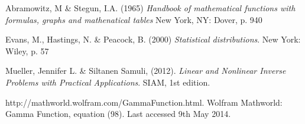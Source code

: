\documentclass[12pt,a4]{article}
\begin{document}
\begin{thebibliography}{9}

\begin{footnotesize}
    
    Abramowitz, M \& Stegun, I.A. (1965)
    \emph{Handbook of mathematical functions with formulas, graphs and mathenatical tables}
    New York, NY: Dover, p. 940
    
    Evans, M., Hastings, N. \& Peacock, B. (2000)
    \emph{Statistical distributions}.
    New York: Wiley, p. 57
    
	Mueller, Jennifer L. \& Siltanen Samuli, (2012).
	\emph{Linear and Nonlinear Inverse Problems with Practical Applications}.
	SIAM, 1st edition.

    http://mathworld.wolfram.com/GammaFunction.html. Wolfram Mathworld: Gamma Function, equation (98). Last accessed 9th May 2014.


\end{footnotesize}

\end{thebibliography}
\end{document}
